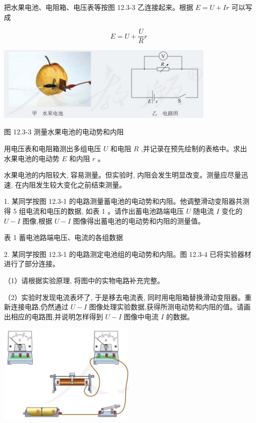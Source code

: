\documentclass[10pt]{article}
\begin{document}
把水果电池、电阻箱、电压表等按图 12.3-3 乙连接起来。根据 \(E = U + {Ir}\) 可以写成

\[
E = U + \frac{U}{R}r
\]

\begin{center}
\includegraphics[max width=0.8\textwidth]{images/01911d5f-8e38-70c0-b5b8-2b399bd115b6_96_523370.jpg}
\end{center}

图 12.3-3 测量水果电池的电动势和内阻

用电压表和电阻箱测出多组电压 \(U\) 和电阻 \(R\) ,并记录在预先绘制的表格中。求出水果电池的电动势 \(E\) 和内阻 \(r\) 。

水果电池的内阻较大, 容易测量。但实验时, 内阻会发生明显改变。测量应尽量迅速, 在内阻发生较大变化之前结束测量。

1. 某同学按图 12.3-1 的电路测量蓄电池的电动势和内阻。他调整滑动变阻器共测得 5 组电流和电压的数据, 如表 1 。请作出蓄电池路端电压 \(U\) 随电流 \(I\) 变化的 \(U - I\) 图像,根据 \(U - I\) 图像得出蓄电池的电动势和内阻的测量值。

表 1 蓄电池路端电压、电流的各组数据

\begin{center}
\end{center}

2. 某同学按图 12.3-1 的电路测定电池组的电动势和内阻。图 12.3-4 已将实验器材进行了部分连接。

（1）请根据实验原理, 将图中的实物电路补充完整。

（2）实验时发现电流表坏了, 于是移去电流表, 同时用电阻箱替换滑动变阻器。重新连接电路,仍然通过 \(U - I\) 图像处理实验数据,获得所测电动势和内阻的值。请画出相应的电路图,并说明怎样得到 \(U - I\) 图像中电流 \(I\) 的数据。

\begin{center}
\includegraphics[max width=0.5\textwidth]{images/01911d5f-8e38-70c0-b5b8-2b399bd115b6_97_795919.jpg}
\end{center}
\end{document}
